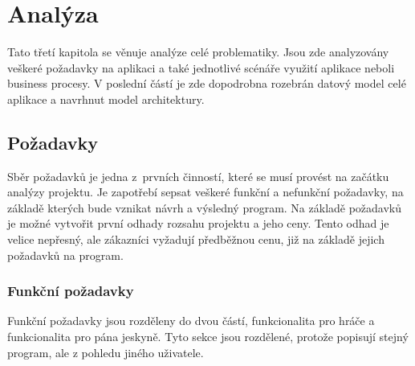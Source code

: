 \documentclass[thesis=B,czech]{resources/FITthesis}[2012/06/26]
\begin{document}
\chapter{Analýza}
Tato třetí kapitola se věnuje analýze celé problematiky. Jsou zde analyzovány veškeré požadavky na aplikaci a také jednotlivé scénáře využití aplikace neboli business procesy.  V poslední částí je zde dopodrobna rozebrán datový model celé aplikace  a navrhnut model architektury. 
	\section{Požadavky}
Sběr požadavků je jedna z~prvních činností, které se musí provést na začátku analýzy projektu. Je zapotřebí sepsat veškeré funkční a nefunkční požadavky, na základě kterých bude vznikat návrh a výsledný program. Na základě požadavků je možné vytvořit první odhady rozsahu projektu a jeho ceny. Tento odhad je velice nepřesný, ale zákazníci vyžadují předběžnou cenu, již na základě jejich požadavků na program. 
	
\subsection{Funkční požadavky}
Funkční požadavky jsou rozděleny do dvou částí, funkcionalita pro hráče a funkcionalita pro pána jeskyně. Tyto sekce jsou rozdělené, protože popisují stejný program, ale z pohledu jiného uživatele.
\end{document}
